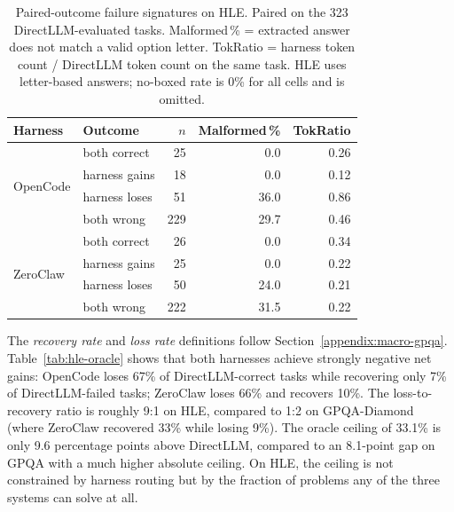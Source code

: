 \begin{table}[t]
\centering
\small
\caption{%
  Paired-outcome failure signatures on HLE.
  Paired on the 323 DirectLLM-evaluated tasks.
  Malformed\,\% = extracted answer does not match a valid option letter.
  TokRatio = harness token count / DirectLLM token count on the same task.
  HLE uses letter-based answers; no-boxed rate is 0\% for all cells and
  is omitted.
}
\label{tab:hle-failure-sig}
\setlength{\tabcolsep}{3.5pt}
\begin{tabular}{llrrr}
\toprule
Harness & Outcome & $n$ & Malformed\,\% & TokRatio \\
\midrule
\multirow{4}{*}{OpenCode}
 & both correct  &  25 &  0.0 & 0.26 \\
 & harness gains &  18 &  0.0 & 0.12 \\
 & harness loses &  51 & 36.0 & 0.86 \\
 & both wrong    & 229 & 29.7 & 0.46 \\
\midrule
\multirow{4}{*}{ZeroClaw}
 & both correct  &  26 &  0.0 & 0.34 \\
 & harness gains &  25 &  0.0 & 0.22 \\
 & harness loses &  50 & 24.0 & 0.21 \\
 & both wrong    & 222 & 31.5 & 0.22 \\
\bottomrule
\end{tabular}
\end{table}


The \emph{recovery rate} and \emph{loss rate} definitions follow
Section~\ref{appendix:macro-gpqa}.
Table~\ref{tab:hle-oracle} shows that both harnesses achieve strongly
negative net gains: OpenCode loses 67\% of DirectLLM-correct tasks while
recovering only 7\% of DirectLLM-failed tasks; ZeroClaw loses 66\% and
recovers 10\%.
The loss-to-recovery ratio is roughly 9:1 on HLE, compared to 1:2 on
GPQA-Diamond (where ZeroClaw recovered 33\% while losing 9\%).
The oracle ceiling of 33.1\% is only 9.6 percentage points above DirectLLM,
compared to an 8.1-point gap on GPQA with a much higher absolute ceiling.
On HLE, the ceiling is not constrained by harness routing but by the fraction
of problems any of the three systems can solve at all.

